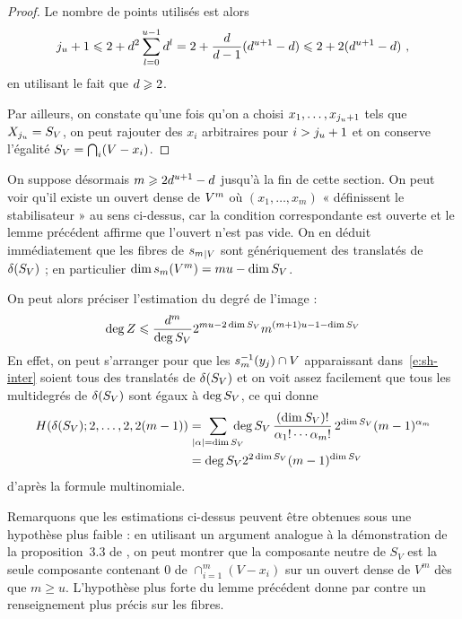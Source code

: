 \begin{proof}
  Le nombre de points utilisés est alors
  \begin{equation}
    j_u + 1
    \leqslant
    2 + d^2 \sum_{l=0}^{u-1} d^l
    =
    2 + \frac{d}{d-1} (d^{u+1} - d)
    \leqslant
    2 + 2 (d^{u+1} - d)
    \text{ ,}
  \end{equation}
  en utilisant le fait que \( d \geqslant 2 \).

  Par ailleurs, on constate qu'une fois qu'on a choisi \( x_1, \dots,
    x_{j_u+1} \) tels que \( X_{j_u} = S_V \), on peut rajouter
  des \( x_i \) arbitraires pour \( i > j_u + 1 \) et on conserve
  l'égalité \( S_V = \bigcap_i (V - x_i) \).
\end{proof}

On suppose désormais \( m \geqslant 2 d^{u+1} - d \) jusqu'à la fin de
cette section.  On peut voir qu'il existe un ouvert dense de \( V^m \) où
\( (x_1, \dots, x_m) \) « définissent le stabilisateur » au sens ci-dessus,
car la condition correspondante est ouverte et le lemme précédent affirme que
l'ouvert n'est pas vide. On en déduit immédiatement que les fibres de \(
  {s_m}_{|V} \) sont génériquement des translatés de \( \delta(S_V) \)
; en particulier \( \dim s_m(V^m) = m u - \dim S_V \).

On peut alors préciser l'estimation du degré de l'image :
\begin{equation}
  \deg Z
  \leqslant
  \frac{ d^m }{ \deg S_V }
  2^{mu - 2\dim S_V} m^{(m+1)u - 1 - \dim S_V}
\end{equation}
En effet, on peut s'arranger pour que les \( s_m^{-1}(y_j) \cap V \)
apparaissant dans~\eqref{e:sh-inter} soient tous des translatés de \(
  \delta(S_V) \) et on voit assez facilement que tous les multidegrés de
\( \delta(S_V) \) sont égaux à \( \deg S_V \), ce qui donne
\begin{align}
  H( \delta(S_\avar); 2, \dots, 2, 2(m-1) )
  & =
  \ \sum_{ \mathclap{\lgr\alpha = \dim S_\avar} } \
  \deg S_\avar
  \, \frac{ (\dim S_\avar)! }{ \alpha_1! \cdots \alpha_m! }
  \, 2^{\dim S_\avar} (m-1)^{\alpha_m}
  \\ & =
  \deg S_\avar
  2^{2\dim S_\avar} (m-1)^{\dim S_\avar}
\end{align}
d'après la formule multinomiale.

Remarquons que les estimations ci-dessus peuvent être obtenues sous une
hypothèse plus faible : en utilisant un argument analogue à la démonstration
de la proposition~3.3 de \cite{remdcl}, on peut montrer que la composante
neutre de \( S_V \) est la seule composante contenant \( 0 \) de \(
  \cap_{i=1}^{m} (V - x_i) \) sur un ouvert dense de \( V^m \) dès que \( m
  \ge u \). L'hypothèse plus forte du lemme précédent donne par contre un
renseignement plus précis sur les fibres.

